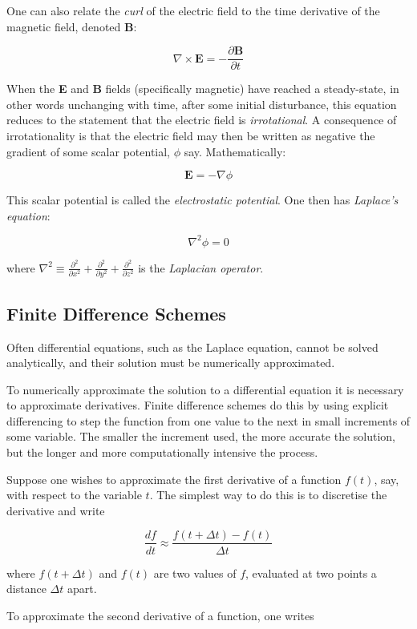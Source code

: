 \documentclass{article}
\newcommand{\be}{\begin{equation}}
\newcommand{\ee}{\end{equation}}
\begin{document}
One can also relate the \emph{curl} of the electric field to the time
derivative of the magnetic field, denoted \textbf{B}:

\be
\nabla \times \bm{E} = - \frac{\partial \bm{B}}{\partial t}
\ee

When the \textbf{E} and \textbf{B} fields (specifically magnetic) have reached
a steady-state, in other words unchanging with time, after some initial disturbance,
this equation reduces to the statement that the electric field is \emph{irrotational}.
A consequence of irrotationality is that the electric field may then be written as negative
the gradient of some scalar potential, $\phi$ say. Mathematically:

\be
\bm{E} = -\nabla \phi
\ee

This scalar potential is called the \emph{electrostatic potential}.
One then has \emph{Laplace's equation}:

\be
\nabla^2 \phi = 0
\ee

where
$\nabla^2 \equiv \frac{\partial^2}{\partial x^2}+\frac{\partial^2}{\partial y^2}+\frac{\partial^2}{\partial z^2}$ 
is the \emph{Laplacian operator}.

\subsection{Finite Difference Schemes}
Often differential equations, such as the Laplace equation, cannot be solved
analytically, and their solution must be numerically approximated.

To numerically approximate the solution to a differential equation it is
necessary to approximate derivatives. Finite difference schemes do this
by using explicit differencing to step the function from one value to the
next in small increments of some variable. The smaller the increment used,
the more accurate the solution, but the longer and more computationally
intensive the process.

Suppose one wishes to approximate the first derivative of a function $f(t)$, say,
with respect to the variable $t$. The simplest way to do this is to discretise the
derivative and write

\be
\frac{df}{dt} \approx \frac{f(t+\Delta t) - f(t)}{\Delta t}
\ee

where $f(t+\Delta t)$ and $f(t)$ are two values of $f$, evaluated at two points
a distance $\Delta t$ apart.

To approximate the second derivative of a function, one writes
\end{document}
